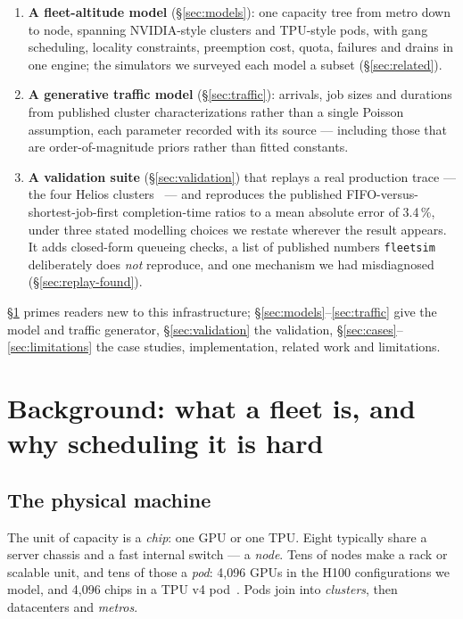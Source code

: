 \begin{enumerate}
\item \textbf{A fleet-altitude model} (\S\ref{sec:models}): one capacity tree
from metro down to node, spanning NVIDIA-style clusters and TPU-style pods, with
gang scheduling, locality constraints, preemption cost, quota, failures and
drains in one engine; the simulators we surveyed each model a subset
(\S\ref{sec:related}).
\item \textbf{A generative traffic model} (\S\ref{sec:traffic}): arrivals, job
sizes and durations from published cluster characterizations rather than a single
Poisson assumption, each parameter recorded with its source --- including those
that are order-of-magnitude priors rather than fitted constants.
\item \textbf{A validation suite} (\S\ref{sec:validation}) that replays a real
production trace --- the four Helios clusters~\cite{helios2021} --- and
reproduces the published FIFO-versus-shortest-job-first completion-time ratios to
a mean absolute error of 3.4\,\%, under three stated modelling choices we restate
wherever the result appears. It adds closed-form queueing checks, a list of
published numbers \texttt{fleetsim} deliberately does \emph{not} reproduce, and
one mechanism we had misdiagnosed (\S\ref{sec:replay-found}).
\end{enumerate}

\S\ref{sec:background} primes readers new to this infrastructure;
\S\ref{sec:models}--\ref{sec:traffic} give the model and traffic generator,
\S\ref{sec:validation} the validation, \S\ref{sec:cases}--\ref{sec:limitations}
the case studies, implementation, related work and limitations.

\section{Background: what a fleet is, and why scheduling it is hard}
\label{sec:background}

\subsection{The physical machine}

The unit of capacity is a \emph{chip}: one GPU or one TPU. Eight typically share
a server chassis and a fast internal switch --- a \emph{node}. Tens of nodes make
a rack or scalable unit, and tens of those a \emph{pod}: 4{,}096 GPUs in the H100
configurations we model, and 4{,}096 chips in a TPU v4 pod~\cite{tpuv4isca2023}.
Pods join into \emph{clusters}, then datacenters and \emph{metros}.

